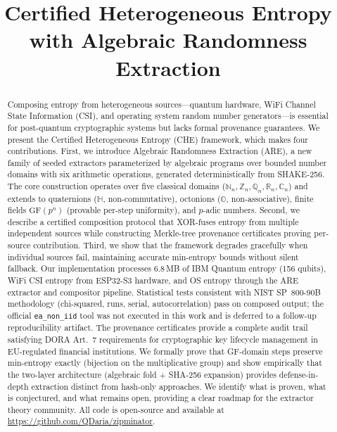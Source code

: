 \documentclass[conference,compsoc]{IEEEtran}
\title{Certified Heterogeneous Entropy with Algebraic Randomness Extraction}
\author{\IEEEauthorblockN{Daniel Mo Houshmand}
\IEEEauthorblockA{QDaria Quantum Research, Oslo, Norway\\
\texttt{mo@qdaria.com}\\
ORCID: 0009-0008-2270-5454}}
\newcommand{\are}{\textsc{ARE}\xspace}
\newcommand{\che}{\textsc{CHE}\xspace}
\newcommand{\N}{\mathbb{N}}
\newcommand{\Z}{\mathbb{Z}}
\newcommand{\Q}{\mathbb{Q}}
\newcommand{\R}{\mathbb{R}}
\newcommand{\CC}{\mathbb{C}}
\begin{document}
\maketitle

\begin{abstract}
Composing entropy from heterogeneous sources---quantum hardware,
WiFi Channel State Information (CSI), and operating system random
number generators---is essential for post-quantum cryptographic
systems but lacks formal provenance guarantees.
%
We present the Certified Heterogeneous Entropy (\che) framework,
which makes four contributions.
%
First, we introduce Algebraic Randomness Extraction (\are), a new
family of seeded extractors parameterized by algebraic programs over
bounded number domains with six arithmetic operations, generated
deterministically from SHAKE-256.
%
The core construction operates over five classical domains
($\N_n, \Z_n, \Q_n, \R_n, \CC_n$) and extends to quaternions
($\mathbb{H}$, non-commutative), octonions ($\mathbb{O}$,
non-associative), finite fields $\mathrm{GF}(p^n)$ (provable
per-step uniformity), and $p$-adic numbers.
%
Second, we describe a certified composition protocol that XOR-fuses
entropy from multiple independent sources while constructing
Merkle-tree provenance certificates proving per-source contribution.
%
Third, we show that the framework degrades gracefully when individual
sources fail, maintaining accurate min-entropy bounds without silent
fallback.
%
Our implementation processes 6.8\,MB of IBM Quantum entropy (156
qubits), WiFi CSI entropy from ESP32-S3 hardware, and OS entropy
through the \are extractor and compositor pipeline.
%
Statistical tests consistent with NIST SP~800-90B methodology
(chi-squared, runs, serial, autocorrelation) pass on composed
output; the official \texttt{ea\_non\_iid} tool was not executed
in this work and is deferred to a follow-up reproducibility
artifact.
%
The provenance certificates provide a complete audit trail satisfying
DORA Art.~7 requirements for cryptographic key lifecycle management
in EU-regulated financial institutions.
%
We formally prove that GF-domain steps preserve min-entropy
exactly (bijection on the multiplicative group) and show
empirically that the two-layer architecture (algebraic fold +
SHA-256 expansion) provides defense-in-depth extraction
distinct from hash-only approaches.
%
We identify what is proven, what is conjectured, and what
remains open, providing a clear roadmap for the extractor
theory community.
%
All code is open-source and available at \url{https://github.com/QDaria/zipminator}.
\end{abstract}
\end{document}
